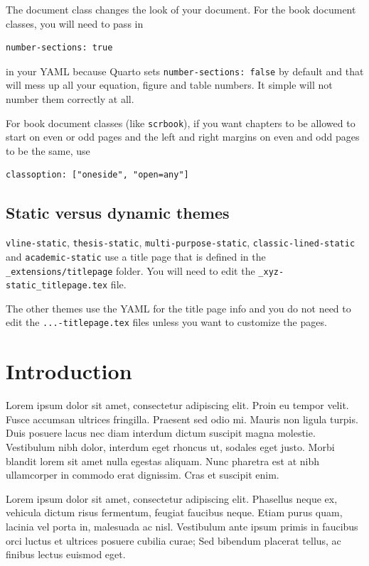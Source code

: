 \documentclass[
  oneside,
  open=any]{scrbook}
\begin{document}
The document class changes the look of your document. For the book
document classes, you will need to pass in

\begin{verbatim}
number-sections: true
\end{verbatim}

in your YAML because Quarto sets \texttt{number-sections:\ false} by
default and that will mess up all your equation, figure and table
numbers. It simple will not number them correctly at all.

For book document classes (like \texttt{scrbook}), if you want chapters
to be allowed to start on even or odd pages and the left and right
margins on even and odd pages to be the same, use

\begin{verbatim}
classoption: ["oneside", "open=any"]
\end{verbatim}

\hypertarget{static-versus-dynamic-themes}{%
\section{Static versus dynamic
themes}\label{static-versus-dynamic-themes}}

\texttt{vline-static}, \texttt{thesis-static},
\texttt{multi-purpose-static}, \texttt{classic-lined-static} and
\texttt{academic-static} use a title page that is defined in the
\texttt{\_extensions/titlepage} folder. You will need to edit the
\texttt{\_xyz-static\_titlepage.tex} file.

The other themes use the YAML for the title page info and you do not
need to edit the \texttt{...-titlepage.tex} files unless you want to
customize the pages.

\hypertarget{introduction}{%
\chapter{Introduction}\label{introduction}}

Lorem ipsum dolor sit amet, consectetur adipiscing elit. Proin eu tempor
velit. Fusce accumsan ultrices fringilla. Praesent sed odio mi. Mauris
non ligula turpis. Duis posuere lacus nec diam interdum dictum suscipit
magna molestie. Vestibulum nibh dolor, interdum eget rhoncus ut, sodales
eget justo. Morbi blandit lorem sit amet nulla egestas aliquam. Nunc
pharetra est at nibh ullamcorper in commodo erat dignissim. Cras et
suscipit enim.

Lorem ipsum dolor sit amet, consectetur adipiscing elit. Phasellus neque
ex, vehicula dictum risus fermentum, feugiat faucibus neque. Etiam purus
quam, lacinia vel porta in, malesuada ac nisl. Vestibulum ante ipsum
primis in faucibus orci luctus et ultrices posuere cubilia curae; Sed
bibendum placerat tellus, ac finibus lectus euismod eget.
\end{document}
